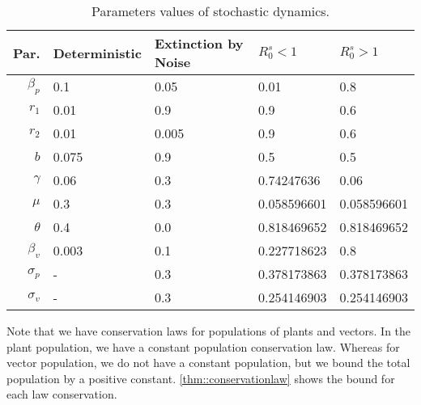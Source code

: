 %
\begin{table}
	\begin{center}
		\begin{tabular}{rllll} 
			\toprule
			Par. & Deterministic & Extinction by Noise & $R^s_0<1$ & $R^s_0>1$ 
			\\ 
			\midrule
				$\beta_p$ 
				& 
                    0.1
                &
				    0.05 
				& 
				    0.01 
				& 
				    0.8 
			\\ 
				$r_1$
				&
				    0.01
				&
				    0.9 
				& 
				    0.9
				& 
				    0.6
			\\
				$r_2$ 
				&
				    0.01
				&
				    0.005 
				& 
				    0.9 
				& 
				    0.6
			\\
				$b$ 
				&
				    0.075
				&
				    0.9 
				&   
				    0.5
				& 
				    0.5 
			\\
				$\gamma$ 
				&
				    0.06
				&
				    0.3
				& 
				    0.74247636 
				& 
				    0.06
			\\
				$\mu$ 
				&
				    0.3
				&
				    0.3 
				& 
				    0.058596601 
				& 
				0.058596601
			\\
				$\theta$ 
				&
				    0.4
				&
				    0.0 
				&   
				    0.818469652
				&   
				    0.818469652
			\\
				$\beta_v$ 
			    &
			        0.003
			    &
			        0.1 
			    & 
			        0.227718623 
			    & 
			        0.8
			\\
			    $\sigma_p$ 
			    &
			        -
			    &
			        0.3 
			    & 
			        0.378173863 
			    & 
			        0.378173863
			\\
                $\sigma_v$ 
                & 
                    -
                &
                    0.3 
                & 
                    0.254146903 
                & 
                    0.254146903 
            \\
			\bottomrule
		\end{tabular}
	\end{center}
	\caption{
		Parameters values of
		stochastic dynamics.
	}
	\label{tbl:value}
	\end{table}


Note that we have conservation laws for populations of plants and vectors.
In the plant population, we have a constant population conservation law.
Whereas for vector population, we do not have a constant population, but we bound
the total population by a positive constant. \autoref{thm::conservationlaw}
shows the bound for each law conservation.

